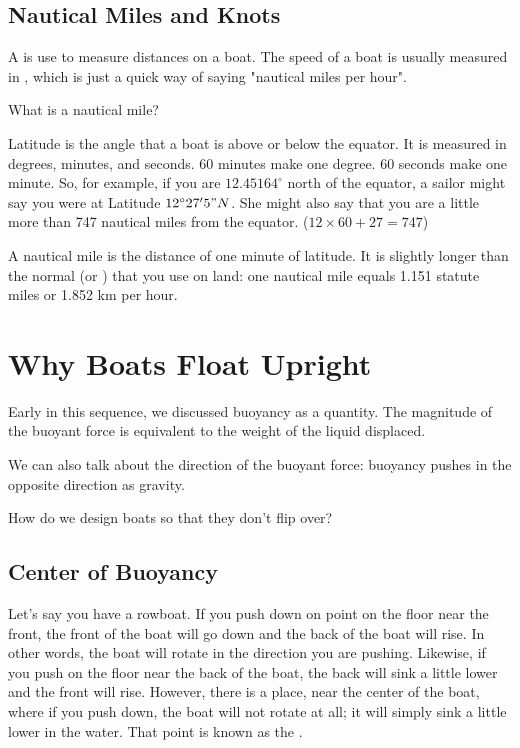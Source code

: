 \subsection{Nautical Miles and Knots}

A  is use to measure distances on a boat. The speed of a boat is usually measured in , which is just a quick way of saying "nautical miles per hour".

What is a nautical mile?

Latitude is the angle that a boat is above or below the equator. It is measured in degrees, minutes, and seconds. 60 minutes make one degree. 60 seconds make one minute.  So, for example, if you are $12.45164^\circ$ north of the equator, a sailor might say you were at Latitude $12^\circ 27' 5" N$.  She might also say that you are a little more than 747 nautical miles from the equator. ($12 \times 60 + 27 = 747$)

A nautical mile is the distance of one minute of latitude. It is slightly longer than the normal (or ) that you use on land: one nautical mile equals 1.151 statute miles or 1.852 km per hour.

\section{Why Boats Float Upright}

Early in this sequence, we discussed buoyancy as a quantity. The magnitude of the buoyant force is equivalent to the weight of the liquid displaced.

We can also talk about the direction of the buoyant force: buoyancy pushes in the opposite direction as gravity.

How do we design boats so that they don't flip over?

\subsection{Center of Buoyancy}

Let's say you have a rowboat. If you push down on point on the floor near the front, the front of the boat will go down and the back of the boat will rise. In other words, the boat will rotate in the direction you are pushing.
Likewise, if you push on the floor near the back of the boat, the back will sink a little lower and the front will rise. However, there is a place, near the center of the boat, where if you push down, the boat will not rotate at all; it will simply sink a little lower
in the water. That point is known as the .

